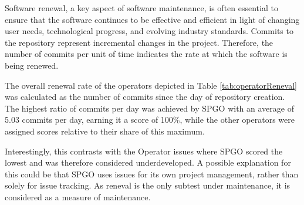 Software renewal, a key aspect of software maintenance, is often essential to ensure that the software continues to be effective and efficient in light of changing user needs, technological progress, and evolving industry standards. Commits to the repository represent incremental changes in the project. Therefore, the number of commits per unit of time indicates the rate at which the software is being renewed.

The overall renewal rate of the operators depicted in Table \ref{tab:operatorReneval} was calculated as the number of commits since the day of repository creation. The highest ratio of commits per day was achieved by SPGO with an average of 5.03 commits per day, earning it a score of 100\%, while the other operators were assigned scores relative to their share of this maximum.

Interestingly, this contrasts with the Operator issues where SPGO scored the lowest and was therefore considered underdeveloped. A possible explanation for this could be that SPGO uses issues for its own project management, rather than solely for issue tracking. As reneval is the only subtest under maintenance, it is considered as a measure of maintenance.






